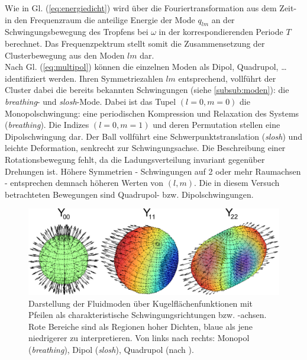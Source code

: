 \documentclass[numbers=noenddot,a4paper]{scrartcl}
\newcommand{\tilt}[1]{\textit{#1}}
\begin{document}
					Wie in Gl. (\ref{eq:energiedicht}) wird \"uber die Fouriertransformation aus dem Zeit- in den Frequenzraum die anteilige Energie der Mode $q_{lm}$ an der Schwingungsbewegung des Tropfens bei $\omega$ in der korrespondierenden Periode  $T$ berechnet. Das Frequenzpektrum stellt somit die Zusammensetzung der Clusterbewegung aus den Moden $lm$ dar.\\
					Nach Gl. (\ref{eq:multipol}) k\"onnen die einzelnen Moden als Dipol, Quadrupol, \dots identifiziert werden. Ihren Symmetriezahlen $lm$ entsprechend, vollf\"uhrt der Cluster dabei die bereits bekannten Schwingungen (siehe \ref{subsub:moden}): die \tilt{breathing}- und \tilt{slosh}-Mode. Dabei ist das Tupel $\left(l=0,m=0\right)$ die Monopolschwingung: eine periodischen Kompression und Relaxation des Systems (\tilt{breathing}). Die Indizes $\left(l=0,m=1\right)$ und deren Permutation stellen eine Dipolschwingung dar. Der Ball vollf\"uhrt eine Schwerpunktstranslation (\tilt{slosh}) und leichte Deformation, senkrecht zur Schwingungsachse. Die Beschreibung einer Rotationsbewegung fehlt, da die Ladungsverteilung invariant gegen\"uber Drehungen ist. H\"ohere Symmetrien - Schwingungen auf 2 oder mehr Raumachsen - entsprechen demnach h\"oheren Werten von $\left(l,m\right)$. Die in diesem Versuch betrachteten Bewegungen sind Quadrupol- bzw. Dipolschwingungen.

						\begin{figure}[H]
                            \centering
                            \includegraphics[width=\textwidth,height=0.375\textwidth]{figs/y001122.png}
                            \caption{Darstellung der Fluidmoden über Kugelflächenfunktionen mit Pfeilen als charakteristische Schwingungsrichtungen bzw. -achsen. Rote Bereiche sind als Regionen hoher Dichten, blaue als jene niedrigerer zu interpretieren. Von links nach rechts: Monopol (\tilt{breathing}), Dipol (\tilt{slosh}), Quadrupol (nach \cite{Mulsow13}).}
                            \label{img:fluidmode}
                        \end{figure}
\end{document}
